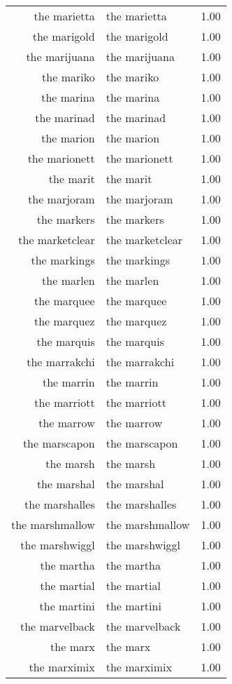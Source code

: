 \begin{table}[ht]
\begin{tabular}{rlr}
  the marietta & the marietta & 1.00 \\ 
  the marigold & the marigold & 1.00 \\ 
  the marijuana & the marijuana & 1.00 \\ 
  the mariko & the mariko & 1.00 \\ 
  the marina & the marina & 1.00 \\ 
  the marinad & the marinad & 1.00 \\ 
  the marion & the marion & 1.00 \\ 
  the marionett & the marionett & 1.00 \\ 
  the marit & the marit & 1.00 \\ 
  the marjoram & the marjoram & 1.00 \\ 
  the markers & the markers & 1.00 \\ 
  the marketclear & the marketclear & 1.00 \\ 
  the markings & the markings & 1.00 \\ 
  the marlen & the marlen & 1.00 \\ 
  the marquee & the marquee & 1.00 \\ 
  the marquez & the marquez & 1.00 \\ 
  the marquis & the marquis & 1.00 \\ 
  the marrakchi & the marrakchi & 1.00 \\ 
  the marrin & the marrin & 1.00 \\ 
  the marriott & the marriott & 1.00 \\ 
  the marrow & the marrow & 1.00 \\ 
  the marscapon & the marscapon & 1.00 \\ 
  the marsh & the marsh & 1.00 \\ 
  the marshal & the marshal & 1.00 \\ 
  the marshalles & the marshalles & 1.00 \\ 
  the marshmallow & the marshmallow & 1.00 \\ 
  the marshwiggl & the marshwiggl & 1.00 \\ 
  the martha & the martha & 1.00 \\ 
  the martial & the martial & 1.00 \\ 
  the martini & the martini & 1.00 \\ 
  the marvelback & the marvelback & 1.00 \\ 
  the marx & the marx & 1.00 \\ 
  the marximix & the marximix & 1.00 \\ 

\end{tabular}
\end{table}
